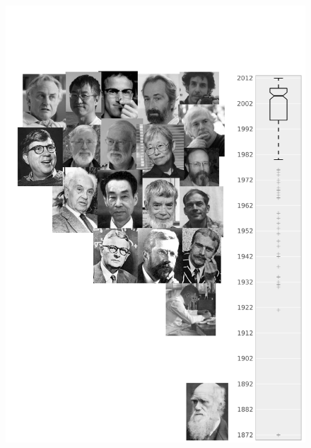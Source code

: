 \documentclass[english,b5paper,11pt]{scrbook} %
\begin{document}
\pagestyle{fancy} %
\begin{figure}[H]
  \includegraphics[height=\textheight]{figures/citations.pdf} \\
\end{figure}


 \label{thebibliograhy}

\pagestyle{headings} %
\end{document}
